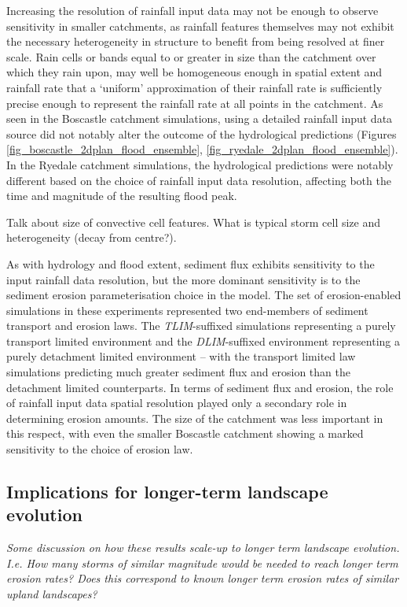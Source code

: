 Increasing the resolution of rainfall input data may not be enough to observe sensitivity in smaller catchments, as rainfall features themselves may not exhibit the necessary heterogeneity in structure to benefit from being resolved at finer scale. Rain cells or bands equal to or greater in size than the catchment over which they rain upon, may well be homogeneous enough in spatial extent and rainfall rate that a `uniform' approximation of their rainfall rate is sufficiently precise enough to represent the rainfall rate at all points in the catchment. As seen in the Boscastle catchment simulations, using a detailed rainfall input data source did not notably alter the outcome of the hydrological predictions (Figures \ref{fig_boscastle_2dplan_flood_ensemble}, \ref{fig_ryedale_2dplan_flood_ensemble}). In the Ryedale catchment simulations, the hydrological predictions were notably different based on the choice of rainfall input data resolution, affecting both the time and magnitude of the resulting flood peak. 

Talk about size of convective cell features. What is typical storm cell size and heterogeneity (decay from centre?).

As with hydrology and flood extent, sediment flux exhibits sensitivity to the input rainfall data resolution, but the more dominant sensitivity is to the sediment erosion parameterisation choice in the model. The set of erosion-enabled simulations in these experiments represented two end-members of sediment transport and erosion laws. The \textit{TLIM}-suffixed simulations representing a purely transport limited environment and the \textit{DLIM}-suffixed environment representing a purely detachment limited environment -- with the transport limited law simulations predicting much greater sediment flux and erosion than the detachment limited counterparts. In terms of sediment flux and erosion, the role of rainfall input data spatial resolution played only a secondary role in determining erosion amounts. The size of the catchment was less important in this respect, with even the smaller Boscastle catchment showing a marked sensitivity to the choice of erosion law.

\subsection{Implications for longer-term landscape evolution}
\textit{Some discussion on how these results scale-up to longer term landscape evolution. I.e. How many storms of similar magnitude would be needed to reach longer term erosion rates? Does this correspond to known longer term erosion rates of similar upland landscapes?}

